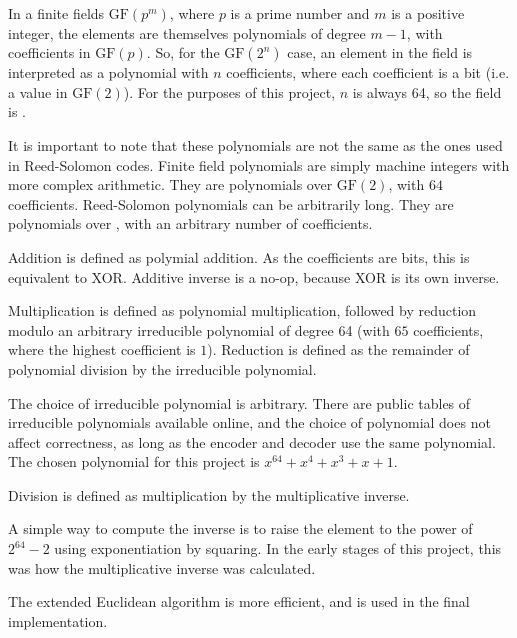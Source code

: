 In a finite fields $\text{GF}(p^m)$, where $p$ is a prime number and $m$ is a positive integer, the elements are themselves polynomials of degree $m - 1$, with coefficients in $\text{GF}(p)$.
So, for the $\text{GF}(2^n)$ case, an element in the field is interpreted as a polynomial with $n$ coefficients, where each coefficient is a bit (i.e. a value in $\text{GF}(2)$).
For the purposes of this project, $n$ is always 64, so the field is .

It is important to note that these polynomials are not the same as the ones used in Reed-Solomon codes.
Finite field polynomials are simply machine integers with more complex arithmetic. They are polynomials over $\text{GF}(2)$, with $64$ coefficients.
Reed-Solomon polynomials can be arbitrarily long. They are polynomials over , with an arbitrary number of coefficients.

Addition is defined as polymial addition. As the coefficients are bits, this is equivalent to XOR.
Additive inverse is a no-op, because XOR is its own inverse.

Multiplication is defined as polynomial multiplication, followed by reduction modulo an arbitrary irreducible polynomial of degree 64 (with $65$ coefficients, where the highest coefficient is $1$).
Reduction is defined as the remainder of polynomial division by the irreducible polynomial.

The choice of irreducible polynomial is arbitrary.
There are public tables of irreducible polynomials available online, and the choice of polynomial does not affect correctness, as long as the encoder and decoder use the same polynomial.
The chosen polynomial for this project is $x^{64} + x^4 + x^3 + x + 1$.

Division is defined as multiplication by the multiplicative inverse.

A simple way to compute the inverse is to raise the element to the power of $2^{64} - 2$ using exponentiation by squaring.
In the early stages of this project, this was how the multiplicative inverse was calculated.

The extended Euclidean algorithm is more efficient, and is used in the final implementation.
